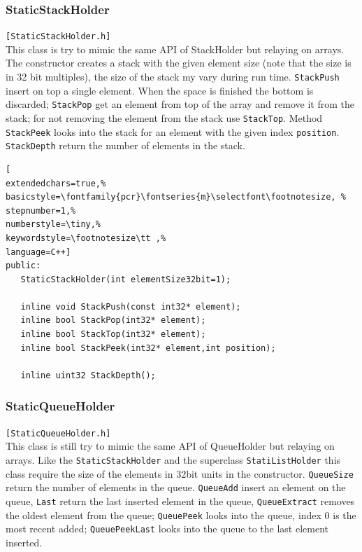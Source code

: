\subsubsection{StaticStackHolder}
\texttt{[StaticStackHolder.h]}\\
This class is try to mimic the same API of StackHolder but relaying on arrays.
The constructor creates a stack with the given element size (note that the size is in 32 bit multiples), the size of the stack my vary during run time.
\texttt{StackPush} insert on top a single element. When the space is finished the bottom is discarded; \texttt{StackPop} get an element from top of the array and remove it from the stack; for not removing the element from the stack use \texttt{StackTop}.
Method \texttt{StackPeek} looks into the stack for an element with the given index \texttt{position}.
\texttt{StackDepth} return the number of elements in the stack.

\begin{lstlisting}[
extendedchars=true,%
basicstyle=\fontfamily{pcr}\fontseries{m}\selectfont\footnotesize, %
stepnumber=1,%
numberstyle=\tiny,%
keywordstyle=\footnotesize\tt ,%
language=C++]
public:
   StaticStackHolder(int elementSize32bit=1);

   inline void StackPush(const int32* element);
   inline bool StackPop(int32* element);
   inline bool StackTop(int32* element);
   inline bool StackPeek(int32* element,int position);

   inline uint32 StackDepth();
\end{lstlisting}



\subsubsection{StaticQueueHolder}
\texttt{[StaticQueueHolder.h]}\\
This class is still try to mimic the same API of QueueHolder but relaying on arrays.
Like the \texttt{StaticStackHolder} and the superclass \texttt{StatiListHolder} this class require the size of the elements in 32bit units in the constructor. \texttt{QueueSize} return the number of elements in the queue.
\texttt{QueueAdd} insert an element on the queue, \texttt{Last} return the last inserted element in the queue, \texttt{QueueExtract} removes the oldest element from the queue; \texttt{QueuePeek} looks into the queue, index 0 is the most recent added; \texttt{QueuePeekLast} looks into the queue to the last element inserted.

